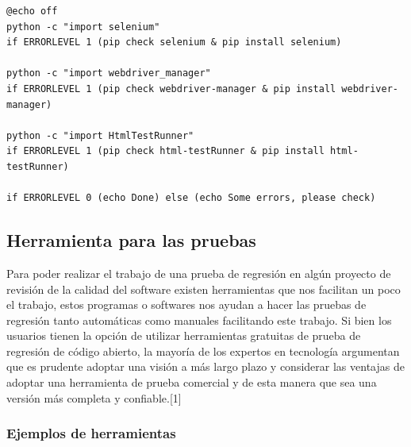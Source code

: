 \documentclass[conference]{IEEEtran}
\begin{document}
\begin{lstlisting}[style=CMD]
@echo off
python -c "import selenium"
if ERRORLEVEL 1 (pip check selenium & pip install selenium)

python -c "import webdriver_manager"
if ERRORLEVEL 1 (pip check webdriver-manager & pip install webdriver-manager)

python -c "import HtmlTestRunner"
if ERRORLEVEL 1 (pip check html-testRunner & pip install html-testRunner)

if ERRORLEVEL 0 (echo Done) else (echo Some errors, please check)
\end{lstlisting}

\subsection{Herramienta para las pruebas}

Para poder realizar el trabajo de una prueba de regresión en algún proyecto de revisión de la calidad del software existen herramientas que nos facilitan un poco el trabajo, estos programas o softwares nos ayudan a hacer las pruebas de regresión tanto automáticas como manuales facilitando este trabajo.
Si bien los usuarios tienen la opción de utilizar herramientas gratuitas de prueba de regresión de código abierto, la mayoría de los expertos en tecnología argumentan que es prudente adoptar una visión a más largo plazo y considerar las ventajas de adoptar una herramienta de prueba comercial y de esta manera que sea una versión más completa y confiable.[1]

\subsubsection{Ejemplos de herramientas}
\end{document}
